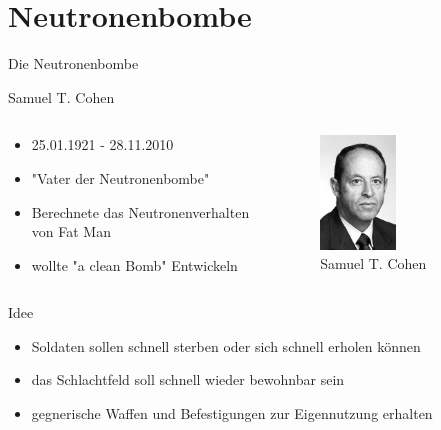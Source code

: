 \section{Neutronenbombe}
\begin{frame}
	\begin{block}{Die Neutronenbombe}
	\end{block}
\end{frame}
\begin{frame}{Samuel T. Cohen}
	\begin{columns}[onlytextwidth]
		\begin{column}{0.45\textwidth}
			\begin{itemize}
				\item 25.01.1921 - 28.11.2010
				\item "Vater der Neutronenbombe"
				\item Berechnete das Neutronenverhalten von Fat Man
				\item wollte "a clean Bomb" Entwickeln
			\end{itemize}
		\end{column}
		\begin{column}{0.45\textwidth}
			\begin{figure}
				\centering
				\includegraphics[width=0.5\textwidth]{img/samuel_cohen.jpg}
				\caption{Samuel T. Cohen \cite{JewCurr}}
			\end{figure}
		\end{column}
	\end{columns}
\end{frame}
\begin{frame}{Idee}
	\begin{itemize}
		\item Soldaten sollen schnell sterben oder sich schnell erholen können
		\item das Schlachtfeld soll schnell wieder bewohnbar sein
		\item gegnerische Waffen und Befestigungen zur Eigennutzung erhalten
	\end{itemize}
\end{frame}
